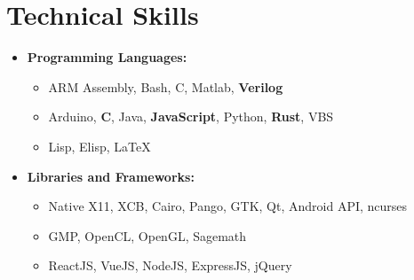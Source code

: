 \documentclass[10pt,letterpaper,sans]{moderncv}
\renewcommand{\_}{\textscale{.7}{\textunderscore}}
\newcommand{\Rplus}{\protect\hspace{-.1em}\protect\raisebox{.35ex}{\smaller{\smaller\textbf{+}}}}
\newcommand{\Cpp}{\mbox{C\Rplus\Rplus}\xspace}
\begin{document}
\section{Technical Skills}
\begin{itemize}
\item \textbf{Programming Languages:}
  \begin{itemize}
    \item {} ARM Assembly, Bash, C, Matlab, \textbf{Verilog}
    \item {} Arduino, \textbf{\Cpp}, Java, \textbf{JavaScript}, Python, \textbf{Rust}, VBS
    \item {} Lisp, Elisp, \LaTeX
  \end{itemize}
\item \textbf{Libraries and Frameworks:} 
  \begin{itemize}
  \item {} Native X11, XCB, Cairo, Pango, GTK, Qt,
    Android API, ncurses
  \item {} GMP, OpenCL, OpenGL, Sagemath
  \item {} ReactJS, VueJS, NodeJS, ExpressJS, jQuery
  \end{itemize}
\end{itemize}
\end{document}
